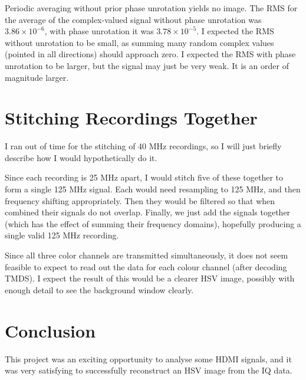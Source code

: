 \documentclass{article}
\begin{document}
Periodic averaging without prior phase unrotation yields no image. The RMS for the average of the complex-valued signal without phase unrotation was $3.86 \times 10^{-6}$, with phase unrotation it was $3.78 \times 10^{-5}$. I expected the RMS without unrotation to be small, as summing many random complex values (pointed in all directions) should approach zero. I expected the RMS with phase unrotation to be larger, but the signal may just be very weak. It is an order of magnitude larger.

\section*{Stitching Recordings Together}
I ran out of time for the stitching of 40 MHz recordings, so I will just briefly describe how I would hypothetically do it.

Since each recording is 25 MHz apart, I would stitch five of these together to form a single 125 MHz signal. Each would need resampling to 125 MHz, and then frequency shifting appropriately. Then they would be filtered so that when combined their signals do not overlap. Finally, we just add the signals together (which has the effect of summing their frequency domains), hopefully producing a single valid 125 MHz recording.

Since all three color channels are transmitted simultaneously, it does not seem feasible to expect to read out the data for each colour channel (after decoding TMDS). I expect the result of this would be a clearer HSV image, possibly with enough detail to see the background window clearly.

\section*{Conclusion}

This project was an exciting opportunity to analyse some HDMI signals, and it was very satisfying to successfully reconstruct an HSV image from the IQ data.

\newpage
\appendix

\newpage


\end{document}
